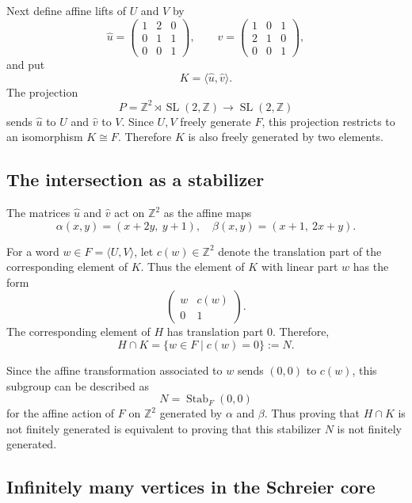 \documentclass[]{amsart}
\newtheorem*{fixed point criterion}{\fixed point criterion}
\theoremstyle{definition}
\theoremstyle{remark}
\numberwithin{equation}{section}
\newcommand{\SL}{\operatorname{SL}}
\newcommand{\Z}{\mathbb Z}
\newcommand{\Stab}{\operatorname{Stab}}
\begin{document}
Next define affine lifts of $U$ and $V$ by
\begin{equation}\label{eq. hatu hatv}
\hat u=
\begin{pmatrix}
1&2&0\\
0&1&1\\
0&0&1
\end{pmatrix},
\qquad
\hat v=
\begin{pmatrix}
1&0&1\\
2&1&0\\
0&0&1
\end{pmatrix}, 
\end{equation}
and put
\[
    K=\langle \hat u,\hat v\rangle.
\]
The projection
\[
    P=\Z^2\rtimes \SL(2,\Z)\longrightarrow \SL(2,\Z)
\]
sends $\hat u$ to $U$ and $\hat v$ to $V$.  Since $U,V$ freely generate
$F$, this projection restricts to an isomorphism $K\cong F$. Therefore $K$ is also freely generated by two elements.

\subsection{The intersection as a stabilizer}

The matrices $\hat u$ and $\hat v$ act on $\Z^2$ as the affine maps
\begin{equation}\label{eq. alapa beta}
  \alpha(x,y)=(x+2y,\ y+1),\quad   \beta(x,y)=(x+1,\ 2x+y).
\end{equation}

For a word $w\in F=\langle U,V\rangle$, let $c(w)\in \Z^2$ denote the
translation part of the corresponding element of $K$.  Thus the element of $K$
with linear part $w$ has the form
\[
\begin{pmatrix}
w & c(w)\\
0 & 1
\end{pmatrix}.
\]
The corresponding element of $H$ has translation part $0$.  Therefore,
\[
    H\cap K=\{w\in F \mid c(w)=0\}:=N.
\]

Since the affine transformation associated to $w$ sends $(0,0)$ to $c(w)$, this
subgroup can be described as
\[
    N=\Stab_F(0,0)
\]
for the affine action of $F$ on $\Z^2$ generated by $\alpha$ and $\beta$.
Thus proving that $H\cap K$ is not finitely generated is equivalent to proving
that this stabilizer $N$ is not finitely generated.

\subsection{Infinitely many vertices in the Schreier core}
\end{document}
